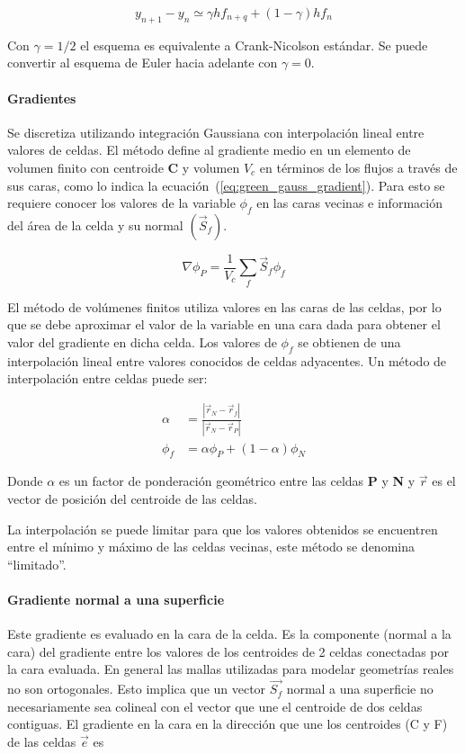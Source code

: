 \begin{equation}
  y_{n+1}-y_{n} \simeq \gamma h f_{n+q} + (1-\gamma)h f_{n}
\end{equation}

Con $\gamma=1/2$ el esquema es equivalente a Crank-Nicolson estándar.
%
Se puede convertir al esquema de Euler hacia adelante con $\gamma=0$.

\paragraph{Gradientes}
%
Se discretiza utilizando integración Gaussiana con interpolación lineal entre
valores de celdas.
%
El método define al gradiente medio en un elemento de volumen finito con
centroide \textbf{C} y volumen $V_{c}$ en términos de los flujos a través de sus
caras, como lo indica la ecuación~(\ref{eq:green_gauss_gradient}).
%
Para esto se requiere conocer los valores de la variable $\phi_{f}$ en las caras
vecinas e información del área de la celda y su normal $(\vec{S}_{f})$.

\begin{equation}
  \label{eq:green_gauss_gradient}
  \nabla \phi_{P} = \frac{1}{V_{c}}\sum_{f} \vec{S}_{f}\phi_{f}
\end{equation}

El método de volúmenes finitos utiliza valores en las caras de las celdas, por
lo que se debe aproximar el valor de la variable en una cara dada para obtener
el valor del gradiente en dicha celda.
%
Los valores de $\phi_{f}$ se obtienen de una interpolación lineal entre valores
conocidos de celdas adyacentes.
%
Un método de interpolación entre celdas puede ser:

\begin{align}
  \label{eq:interpolacion_lineal_caras}
  \alpha &= \frac{|{\vec{r}_{N}-\vec{r}_{f}}|} {|{\vec{r}_{N}-\vec{r}_{P}}|}\\
  \phi_{f} &= \alpha\phi_{P}+(1-\alpha)\phi_{N}
\end{align}

Donde $\alpha$ es un factor de ponderación geométrico entre las celdas
\textbf{P} y \textbf{N} y $\vec{r}$ es el vector de posición del centroide de
las celdas.

La interpolación se puede limitar para que los valores obtenidos se encuentren
entre el mínimo y máximo de las celdas vecinas, este método se denomina
``limitado''.


\paragraph{Gradiente normal a una superficie}
%
Este gradiente es evaluado en la cara de la celda.
%
Es la componente (normal a la cara) del gradiente entre los valores de los
centroides de 2 celdas conectadas por la cara evaluada.
%
En general las mallas utilizadas para modelar geometrías reales no son
ortogonales.
%
Esto implica que un vector $\vec{S_{f}}$ normal a una superficie no
necesariamente sea colineal con el vector que une el centroide de dos celdas
contiguas.
%
El gradiente en la cara en la dirección que une los centroides (C y F) de las
celdas $\vec{e}$ es

